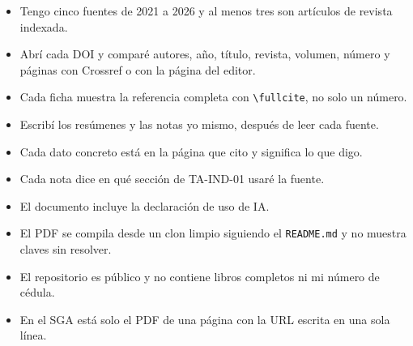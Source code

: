 \documentclass[11pt,a4paper]{article}
\begin{document}
\begin{okBox}[title={Lista de verificación antes del cierre}]
	\begin{itemize}
		\item[$\square$] Tengo cinco fuentes de 2021 a 2026 y al menos tres son artículos de revista indexada.
		\item[$\square$] Abrí cada DOI y comparé autores, año, título, revista, volumen, número y páginas con Crossref o con la página del editor.
		\item[$\square$] Cada ficha muestra la referencia completa con \verb|\fullcite|, no solo un número.
		\item[$\square$] Escribí los resúmenes y las notas yo mismo, después de leer cada fuente.
		\item[$\square$] Cada dato concreto está en la página que cito y significa lo que digo.
		\item[$\square$] Cada nota dice en qué sección de TA-IND-01 usaré la fuente.
		\item[$\square$] El documento incluye la declaración de uso de IA.
		\item[$\square$] El PDF se compila desde un clon limpio siguiendo el \texttt{README.md} y no muestra claves sin resolver.
		\item[$\square$] El repositorio es público y no contiene libros completos ni mi número de cédula.
		\item[$\square$] En el SGA está solo el PDF de una página con la URL escrita en una sola línea.
	\end{itemize}
\end{okBox}

\printbibliography[heading=bibintoc,title={Referencias}]
\end{document}
